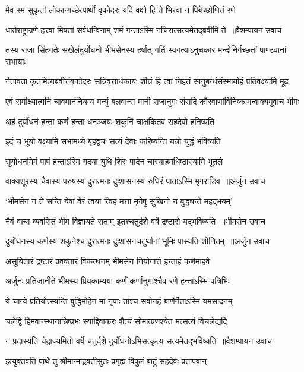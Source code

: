 \twolineshloka
{मैव स्म सुकृतां लोकान्गच्छेत्पार्थो वृकोदरः}
{यदि वक्षो हि ते भित्त्वा न पिबेच्छोणितं रणे}


\twolineshloka
{धार्तराष्ट्रान्रणे हत्त्वा मिषतां सर्वधन्विनाम्}
{शमं गन्ताऽस्मि नचिरात्सत्यमेतद्ब्रवीमि ते ॥वैशम्पायन उवाच}


\twolineshloka
{तस्य राजा सिंहगतेः सखेलंदुर्योधनो भीमसेनस्य हर्षात्}
{गतिं स्वगत्याऽनुचकार मन्दोनिर्गच्छतां पाण्डवानां सभायाः}


\twolineshloka
{नैतावता कृतमित्यब्रवीत्तंवृकोदरः सन्निवृत्तार्धकायः}
{शीघ्रं हि त्वां निहतं सानुबन्धंसंस्मार्याहं प्रतिवक्ष्यामि मूढ}


\twolineshloka
{एवं समीक्ष्यात्मनि चावमानंनियम्य मन्युं बलवान्स मानी}
{राजानुगः संसदि कौरवाणांविनिष्कामन्वाक्यमुवाच भीमः}


\twolineshloka
{अहं दुर्योधनं हन्ता कर्णं हन्ता धनञ्जयः}
{शकुनिं चाक्षकितवं सहदेवो हनिष्यति}


\twolineshloka
{इदं च भूयो वक्ष्यामि सभामध्ये बृहद्वचः}
{सत्यं देवाः करिष्यन्ति यन्नो युद्धं भविष्यति}


\twolineshloka
{सुयोधनमिमं पापं हन्ताऽस्मि गदया युधि}
{शिरः पादेन चास्याहमधिष्ठास्यामि भूतले}


\twolineshloka
{वाक्यशूरस्य चैवास्य परुषस्य दुरात्मनः}
{दुःशासनस्य रुधिरं पाताऽस्मि मृगराडिव ॥अर्जुन उवाच}


\twolineshloka
{`भीमसेन न ते सन्ति येषां वैरं त्वया त्विह}
{मत्ता मृगेषु सुखिनो न बुद्ध्यन्ते महद्भयम्'}


\twolineshloka
{नैवं वाचा व्यवसितं भीम विज्ञायते सताम्}
{इतश्चतुर्दशे वर्षे द्रष्टारो यद्भविष्यति ॥भीमसेन उवाच}


\twolineshloka
{दुर्योधनस्य कर्णस्य शकुनेश्च दुरात्मनः}
{दुःशासनचतुर्थानां भूमिः पास्यति शोणितम् ॥अर्जुन उवाच}


\twolineshloka
{असूयितारं द्रष्टारं प्रवक्तारं विकत्थनम्}
{भीमसेन नियोगात्ते हन्ताहं कर्णमाहवे}


\twolineshloka
{अर्जुनः प्रतिजानीते भीमस्य प्रियकाम्यया}
{कर्णं कर्णानुगांश्चैव रणे हन्ताऽस्मि पत्रिभिः}


\twolineshloka
{ये चान्ये प्रतियोत्स्यन्ति बुद्धिमोहेन मां नृपाः}
{तांश्च सर्वानहं बाणैर्नेताऽस्मि यमसादनम्}


\twolineshloka
{चलेद्वि हिमवान्स्थानान्निष्प्रभः स्याद्दिवाकरः}
{शैत्यं सोमात्प्रणश्येत मत्सत्यं विचलेद्यदि}


\twolineshloka
{न प्रदास्यति चेद्राज्यमितो वर्षे चतुर्दशे}
{दुर्योधनोऽभिसत्कृत्य सत्यमेतद्भविष्यति ॥वैशम्पायन उवाच}


\twolineshloka
{इत्युक्तवति पार्थे तु श्रीमान्माद्रवतीसुतः}
{प्रगृह्य विपुलं बाहुं सहदेवः प्रतापवान्}


